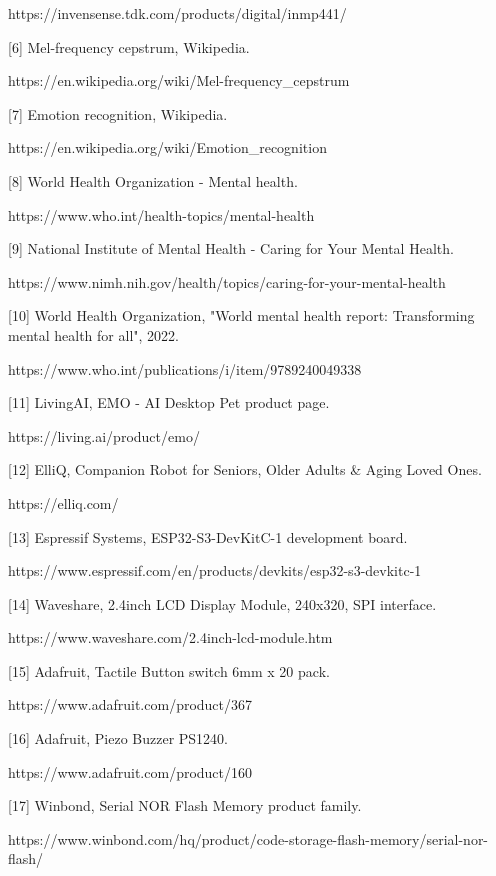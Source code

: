 \documentclass[12pt,a4paper]{article}
\begin{document}
https://invensense.tdk.com/products/digital/inmp441/


[6] Mel-frequency cepstrum, Wikipedia.

https://en.wikipedia.org/wiki/Mel-frequency\_cepstrum


[7] Emotion recognition, Wikipedia.

https://en.wikipedia.org/wiki/Emotion\_recognition


[8] World Health Organization - Mental health.

https://www.who.int/health-topics/mental-health


[9] National Institute of Mental Health - Caring for Your Mental Health.

https://www.nimh.nih.gov/health/topics/caring-for-your-mental-health


[10] World Health Organization, "World mental health report: Transforming mental health for all", 2022.

https://www.who.int/publications/i/item/9789240049338


[11] LivingAI, EMO - AI Desktop Pet product page.

https://living.ai/product/emo/


[12] ElliQ, Companion Robot for Seniors, Older Adults \& Aging Loved Ones.

https://elliq.com/


[13] Espressif Systems, ESP32-S3-DevKitC-1 development board.

https://www.espressif.com/en/products/devkits/esp32-s3-devkitc-1


[14] Waveshare, 2.4inch LCD Display Module, 240x320, SPI interface.

https://www.waveshare.com/2.4inch-lcd-module.htm


[15] Adafruit, Tactile Button switch 6mm x 20 pack.

https://www.adafruit.com/product/367


[16] Adafruit, Piezo Buzzer PS1240.

https://www.adafruit.com/product/160


[17] Winbond, Serial NOR Flash Memory product family.

https://www.winbond.com/hq/product/code-storage-flash-memory/serial-nor-flash/
\end{document}
